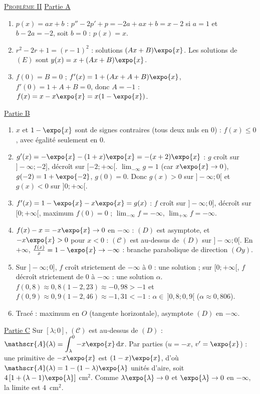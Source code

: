 \begin{corrige}
\noindent \underline{\textsc{Probl\`eme II}} \newline
\underline{Partie A}
\begin{enumerate}
\item $p(x) = ax + b$ : $p'' - 2p' + p = -2a + ax + b = x - 2$ si $a = 1$ et $b - 2a = -2$, soit $b = 0$ : $p(x) = x$.
\item $r^2 - 2r + 1 = (r - 1)^2$ : solutions $(Ax + B)\expo{x}$. Les solutions de $(E)$ sont $y(x) = x + (Ax + B)\expo{x}$.
\item $f(0) = B = 0$ ; $f'(x) = 1 + (Ax + A + B)\expo{x}$, $f'(0) = 1 + A + B = 0$, donc $A = -1$ : $f(x) = x - x\expo{x} = x(1 - \expo{x})$.
\end{enumerate}
\underline{Partie B}
\begin{enumerate}
\item $x$ et $1 - \expo{x}$ sont de signes contraires (tous deux nuls en 0) : $f(x) \leq 0$, avec \'egalit\'e seulement en $0$.
\item $g'(x) = -\expo{x} - (1 + x)\expo{x} = -(x + 2)\expo{x}$ : $g$ cro\^it sur $]-\infty ; -2]$, d\'ecro\^it sur $[-2 ; +\infty[$.
      $\lim_{-\infty} g = 1$ (car $x\expo{x} \to 0$), $g(-2) = 1 + \expo{-2}$, $g(0) = 0$. Donc $g(x) > 0$ sur $]-\infty ; 0[$ et $g(x) < 0$ sur $]0 ; +\infty[$.
\item $f'(x) = 1 - \expo{x} - x\expo{x} = g(x)$ : $f$ cro\^it sur $]-\infty ; 0]$, d\'ecro\^it sur $[0 ; +\infty[$, maximum $f(0) = 0$ ;
      $\lim_{-\infty} f = -\infty$, $\lim_{+\infty} f = -\infty$.
\item $f(x) - x = -x\expo{x} \to 0$ en $-\infty$ : $(D)$ est asymptote, et $-x\expo{x} > 0$ pour $x < 0$ : $(\mathscr{C})$ est au-dessus de $(D)$ sur $]-\infty ; 0[$.
      En $+\infty$, $\frac{f(x)}{x} = 1 - \expo{x} \to -\infty$ : branche parabolique de direction $(Oy)$.
\item Sur $]-\infty ; 0]$, $f$ cro\^it strictement de $-\infty$ \`a $0$ : une solution ; sur $[0 ; +\infty[$, $f$ d\'ecro\^it strictement de $0$ \`a $-\infty$ :
      une solution $\alpha$. $f(0{,}8) \approx 0{,}8(1 - 2{,}23) \approx -0{,}98 > -1$ et $f(0{,}9) \approx 0{,}9(1 - 2{,}46) \approx -1{,}31 < -1$ :
      $\alpha \in\ ]0{,}8 ; 0{,}9[$ ($\alpha \approx 0{,}806$).
\item Trac\'e : maximum en $O$ (tangente horizontale), asymptote $(D)$ en $-\infty$.
\end{enumerate}
\underline{Partie C} \newline
Sur $[\lambda ; 0]$, $(\mathscr{C})$ est au-dessus de $(D)$ : $\mathscr{A}(\lambda) = \displaystyle\int_\lambda^0 -x\expo{x}\,\mathrm{d}x$.
Par parties ($u = -x$, $v' = \expo{x}$) : une primitive de $-x\expo{x}$ est $(1 - x)\expo{x}$, d'o\`u
$\mathscr{A}(\lambda) = 1 - (1 - \lambda)\expo{\lambda}$ unit\'es d'aire, soit $4\left[1 + (\lambda - 1)\expo{\lambda}\right]$ cm$^2$.
Comme $\lambda\expo{\lambda} \to 0$ et $\expo{\lambda} \to 0$ en $-\infty$, la limite est $4$~cm$^2$.


\end{corrige}
